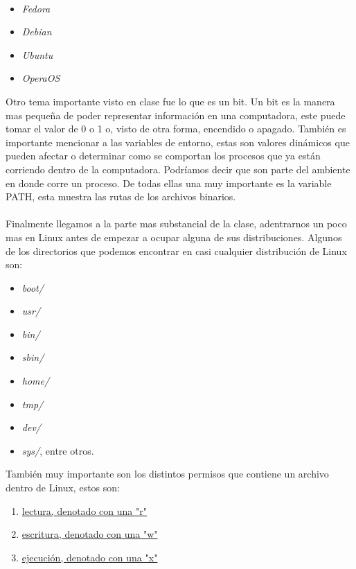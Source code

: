 \documentclass[letterpaper, 12pt, oneside]{article}
\begin{document}
	\\
	\begin{itemize}
		\item \textit{Fedora}
		\item \textit{Debian}
		\item \textit{Ubuntu}
		\item \textit{OperaOS}
	\\
	\end{itemize}
	Otro tema importante visto en clase fue lo que es un bit. Un bit es la manera mas pequeña de poder representar información en una computadora, este puede tomar el valor de 0 o 1 o, visto de otra forma, encendido o apagado. También es importante mencionar a las variables de entorno, estas son valores dinámicos que pueden afectar o determinar como se comportan los procesos que ya están corriendo dentro de la computadora. Podríamos decir que son parte del ambiente en donde corre un proceso. De todas ellas una muy importante es la variable PATH, esta muestra las rutas de los archivos binarios. 
	\\
	\\
	Finalmente llegamos a la parte mas substancial de la clase, adentrarnos un poco mas en Linux antes de empezar a ocupar alguna de sus distribuciones. Algunos de los directorios que podemos encontrar en casi cualquier distribución de Linux son:
	\\
	\begin{itemize}
		\item \textit{boot/}
		\item \textit{usr/}
		\item \textit{bin/}
		\item \textit{sbin/}
		\item \textit{home/}
		\item \textit{tmp/}
		\item \textit{dev/}
		\item \textit{sys/}, entre otros.
	\\
	\end{itemize}
	También muy importante son los distintos permisos que contiene un archivo dentro de Linux, estos son:
	\\
	\begin{enumerate}
		\item \underline{lectura, denotado con una "r"}
		\item \underline{escritura, denotado con una "w"}
		\item \underline{ejecución, denotado con una "x"}
	\\
	\end{enumerate}	
\end{document}
